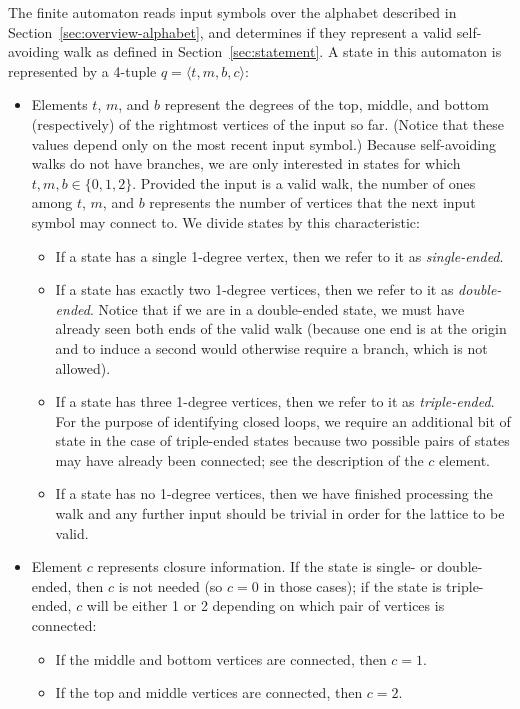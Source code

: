 The finite automaton reads input symbols over the alphabet described in Section~\ref{sec:overview-alphabet}, and determines if they represent a valid self-avoiding walk as defined in Section~\ref{sec:statement}. A state in this automaton is represented by a 4-tuple $q = \langle t, m, b, c\rangle$:
\begin{itemize}
\item Elements $t$, $m$, and $b$ represent the degrees of the top, middle, and bottom (respectively) of the rightmost vertices of the input so far. (Notice that these values depend only on the most recent input symbol.) Because self-avoiding walks do not have branches, we are only interested in states for which $t, m, b \in \{0, 1, 2\}$. Provided the input is a valid walk, the number of ones among $t$, $m$, and $b$ represents the number of vertices that the next input symbol may connect to. We divide states by this characteristic:
\begin{itemize}
\item If a state has a single 1-degree vertex, then we refer to it as \emph{single-ended}.
\item If a state has exactly two 1-degree vertices, then we refer to it as \emph{double-ended}. Notice that if we are in a double-ended state, we must have already seen both ends of the valid walk (because one end is at the origin and to induce a second would otherwise require a branch, which is not allowed).
\item If a state has three 1-degree vertices, then we refer to it as \emph{triple-ended}. For the purpose of identifying closed loops, we require an additional bit of state in the case of triple-ended states because two possible pairs of states may have already been connected; see the description of the $c$ element.
\item If a state has no 1-degree vertices, then we have finished processing the walk and any further input should be trivial in order for the lattice to be valid.
\end{itemize}
\item Element $c$ represents closure information. If the state is single- or double-ended, then $c$ is not needed (so $c=0$ in those cases); if the state is triple-ended, $c$ will be either 1 or 2 depending on which pair of vertices is connected:
\begin{itemize}
\item If the middle and bottom vertices are connected, then $c=1$.
\item If the top and middle vertices are connected, then $c=2$.
\end{itemize}
\end{itemize}

